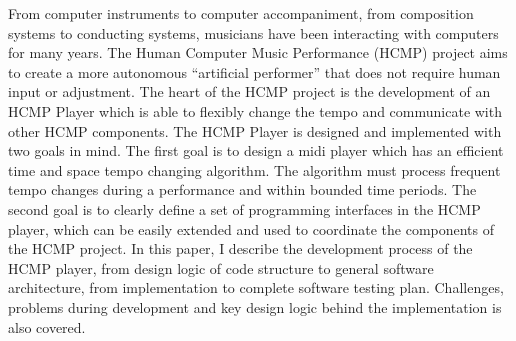 


\begin{abstracts}
From computer instruments to computer accompaniment, from composition
systems to conducting systems, musicians have been interacting with
computers for many years. The Human Computer Music Performance (HCMP)
project aims to create a more autonomous ``artificial  performer'' that does
not require human input or adjustment.  The heart of the HCMP project is the
development of an HCMP Player which is able to flexibly change the tempo and
communicate with other HCMP components.
The HCMP Player is designed and implemented with two goals in mind. The
first goal is to design a midi player which has an efficient time and space
tempo changing algorithm. The algorithm must process frequent tempo changes
during a performance and within bounded time periods. The second goal is to
clearly define a set of programming interfaces in the HCMP player, which can
be easily extended and used to coordinate the components of the HCMP
project. In this paper, I describe the development process of the HCMP
player, from design logic of code structure to general software
architecture, from implementation to complete software testing plan.
Challenges, problems during development and key design logic behind the
implementation is also covered.
\end{abstracts}
